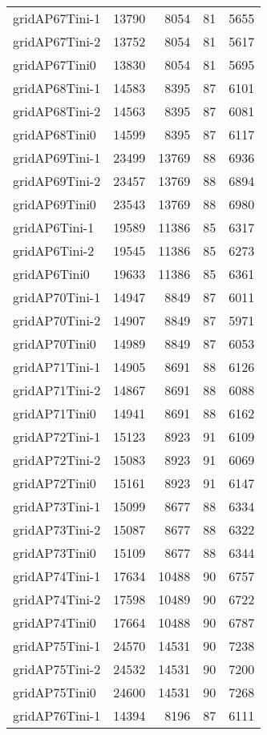 \begin{longtable}{lrrrr}
gridAP67Tini-1 & 13790 & 8054 & 81 & 5655 \\
gridAP67Tini-2 & 13752 & 8054 & 81 & 5617 \\
gridAP67Tini0 & 13830 & 8054 & 81 & 5695 \\
gridAP68Tini-1 & 14583 & 8395 & 87 & 6101 \\
gridAP68Tini-2 & 14563 & 8395 & 87 & 6081 \\
gridAP68Tini0 & 14599 & 8395 & 87 & 6117 \\
gridAP69Tini-1 & 23499 & 13769 & 88 & 6936 \\
gridAP69Tini-2 & 23457 & 13769 & 88 & 6894 \\
gridAP69Tini0 & 23543 & 13769 & 88 & 6980 \\
gridAP6Tini-1 & 19589 & 11386 & 85 & 6317 \\
gridAP6Tini-2 & 19545 & 11386 & 85 & 6273 \\
gridAP6Tini0 & 19633 & 11386 & 85 & 6361 \\
gridAP70Tini-1 & 14947 & 8849 & 87 & 6011 \\
gridAP70Tini-2 & 14907 & 8849 & 87 & 5971 \\
gridAP70Tini0 & 14989 & 8849 & 87 & 6053 \\
gridAP71Tini-1 & 14905 & 8691 & 88 & 6126 \\
gridAP71Tini-2 & 14867 & 8691 & 88 & 6088 \\
gridAP71Tini0 & 14941 & 8691 & 88 & 6162 \\
gridAP72Tini-1 & 15123 & 8923 & 91 & 6109 \\
gridAP72Tini-2 & 15083 & 8923 & 91 & 6069 \\
gridAP72Tini0 & 15161 & 8923 & 91 & 6147 \\
gridAP73Tini-1 & 15099 & 8677 & 88 & 6334 \\
gridAP73Tini-2 & 15087 & 8677 & 88 & 6322 \\
gridAP73Tini0 & 15109 & 8677 & 88 & 6344 \\
gridAP74Tini-1 & 17634 & 10488 & 90 & 6757 \\
gridAP74Tini-2 & 17598 & 10489 & 90 & 6722 \\
gridAP74Tini0 & 17664 & 10488 & 90 & 6787 \\
gridAP75Tini-1 & 24570 & 14531 & 90 & 7238 \\
gridAP75Tini-2 & 24532 & 14531 & 90 & 7200 \\
gridAP75Tini0 & 24600 & 14531 & 90 & 7268 \\
gridAP76Tini-1 & 14394 & 8196 & 87 & 6111 \\

\end{longtable}
